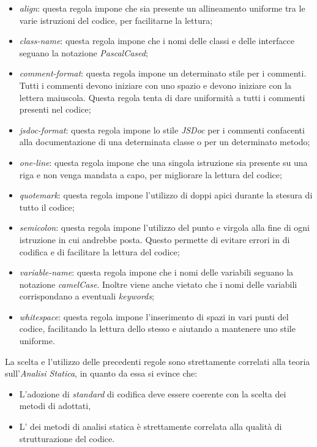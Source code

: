 \begin{itemize}
                \item \textit{align}: questa regola impone che sia presente un allineamento uniforme tra le varie istruzioni del codice, per facilitarne la lettura;
                \item \textit{class-name}: questa regola impone che i nomi delle classi e delle interfacce seguano la notazione \textit{PascalCased};
                \item \textit{comment-format}: questa regola impone un determinato stile per i commenti. Tutti i commenti devono iniziare con uno spazio e devono iniziare con la lettera maiuscola. Questa regola tenta di dare uniformit\`a a tutti i commenti presenti nel codice;
                \item \textit{jsdoc-format}: questa regola impone lo stile \textit{JSDoc} per i commenti confacenti alla documentazione di una determinata classe o per un determinato metodo;
                \item \textit{one-line}: questa regola impone che una singola istruzione sia presente su una riga e non venga mandata a capo, per migliorare la lettura del codice;
                \item \textit{quotemark}: questa regola impone l'utilizzo di doppi apici durante la stesura di tutto il codice;
                \item \textit{semicolon}: questa regola impone l'utilizzo del punto e virgola alla fine di ogni istruzione in cui andrebbe posta. Questo permette di evitare errori in  di codifica e di facilitare la lettura del codice;
                \item \textit{variable-name}: questa regola impone che i nomi delle variabili seguano la notazione \textit{camelCase}. Inoltre viene anche vietato che i nomi delle variabili corrispondano a eventuali \textit{keywords};
                  \item \textit{whitespace}: questa regola impone l'inserimento di spazi in vari punti del codice, facilitando la lettura dello stesso e aiutando a mantenere uno stile uniforme.
                \end{itemize}

                
                La scelta e l'utilizzo delle precedenti regole sono strettamente correlati alla teoria sull'\textit{Analisi Statica}, in quanto da essa si evince che:
                \begin{itemize}
		  \item L’adozione di \textit{standard} di codifica deve essere coerente con la scelta dei metodi di  adottati,         
		  \item L’ dei metodi di analisi statica \`e strettamente correlata alla qualit\`a di strutturazione del codice.
                \end{itemize}

